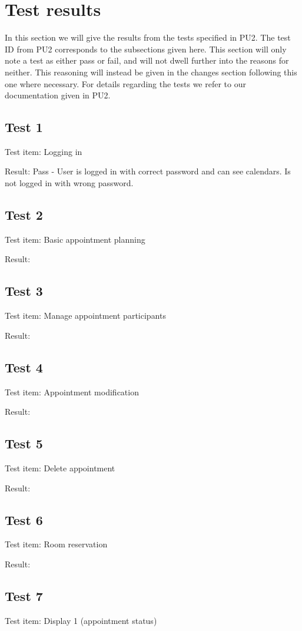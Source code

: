 \section{Test results}
In this section we will give the results from the tests specified in PU2. The test ID from PU2 corresponds to the subsections given here. This section will only note a test as either pass or fail, and will not dwell further into the reasons for neither. This reasoning will instead be given in the changes section following this one where necessary. For details regarding the tests we refer to our documentation given in PU2.
\subsection{Test 1}
Test item: Logging in

Result: Pass - User is logged in with correct password and can see calendars. Is not logged in with wrong password.

\subsection{Test 2}
Test item: Basic appointment planning

Result:

\subsection{Test 3}
Test item: Manage appointment participants

Result: 

\subsection{Test 4}
Test item: Appointment modification

Result:

\subsection{Test 5}
Test item: Delete appointment

Result:

\subsection{Test 6}
Test item: Room reservation

Result:

\subsection{Test 7}
Test item: Display 1 (appointment status)

